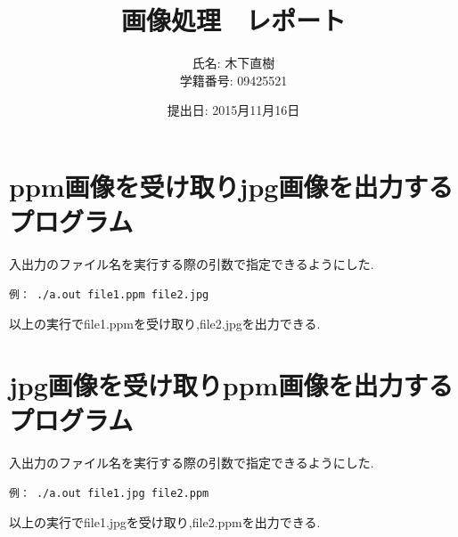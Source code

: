 \documentclass[a4j]{jarticle}
\title{画像処理　レポート}
\author{氏名: 木下直樹\\学籍番号: 09425521}
\date{提出日: 2015月11月16日}
\begin{document}
\maketitle

\section{ppm画像を受け取りjpg画像を出力するプログラム}
入出力のファイル名を実行する際の引数で指定できるようにした.
\begin{verbatim}
例： ./a.out file1.ppm file2.jpg 
\end{verbatim}
以上の実行でfile1.ppmを受け取り,file2.jpgを出力できる.
\section{jpg画像を受け取りppm画像を出力するプログラム}
入出力のファイル名を実行する際の引数で指定できるようにした.
\begin{verbatim}
例： ./a.out file1.jpg file2.ppm
\end{verbatim}
以上の実行でfile1.jpgを受け取り,file2.ppmを出力できる.
\end{document}
